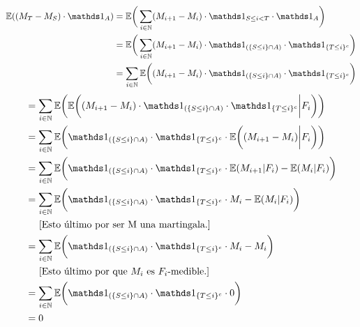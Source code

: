 	 \begin{align}
	 	\E((M_T - M_S) \cdot \indic_A)	
	 									&=		
	 	\E\bigg( \sum_{ i \in \N} ( M_{i+1} - M_i) \cdot \indic_{S \leq i < T } \cdot \indic_A \bigg)									\\
	 									&=		
	 	\E	\bigg( 
	 			\sum_{ i \in \N} 
	 				( M_{i+1} - M_i) \cdot \indic_{(\{S \leq i \} \cap A)} \cdot \indic_{\{ T \leq i \}^c} 
	 		\bigg)																														\\
	 									&=		
	 	\sum_{ i \in \N} 
	 		\E	\bigg(
	 				( M_{i+1} - M_i) \cdot \indic_{(\{S \leq i \} \cap A)} \cdot \indic_{\{ T \leq i \}^c} 
	 			\bigg)																													
	\end{align}
	\begin{align}
	 									&=		
	 	\sum_{ i \in \N} 
	 		\E	\bigg(
		 			\E	\bigg(
		 					( M_{i+1} - M_i) \cdot \indic_{(\{S \leq i \} \cap A)} \cdot \indic_{\{ T \leq i \}^c}  \bigg| F_i	
						\bigg)
	 			\bigg)																													\\
										&=
	 	\sum_{ i \in \N} 
	 		\E	\bigg(
					\indic_{(\{S \leq i \} \cap A)} \cdot \indic_{\{ T \leq i \}^c} \cdot
		 			\E	\bigg(
		 					 ( M_{i+1} - M_i)  \bigg| F_i	 												
						\bigg)
	 			\bigg)																													\\
										&=
	 	\sum_{ i \in \N} 
	 		\E	\bigg(
					\indic_{(\{S \leq i \} \cap A)} \cdot \indic_{\{ T \leq i \}^c} \cdot
		 			\E	(
		 					 M_{i+1} | F_i	 												
						)
					-
					\E	(
		 					 M_i  | F_i	 												
						)
	 			\bigg)																													\\
										&=
	 	\sum_{ i \in \N} 
	 		\E	\bigg(
					\indic_{(\{S \leq i \} \cap A)} \cdot \indic_{\{ T \leq i \}^c} \cdot
		 					 M_i
					-
					\E	(
		 					 M_i  | F_i	 												
						)
	 			\bigg)\label{problema1_4:aplicacion_de_que_M_es_martingala}																\\
										&\;\;\;\;\; \mbox{[Esto último por ser M una martingala.]}									    \\
										&=
	 	\sum_{ i \in \N} 
	 		\E	\bigg(
					\indic_{(\{S \leq i \} \cap A)} \cdot \indic_{\{ T \leq i \}^c} \cdot
		 			 M_i
						-
					 M_i
	 			\bigg)																													\\
										&\;\;\;\;\; \mbox{[Esto último por que $M_i$ es $F_i$-medible.]}								\\
										&=
		\sum_{ i \in \N} 
	 		\E	\bigg(
					\indic_{(\{S \leq i \} \cap A)} \cdot \indic_{\{ T \leq i \}^c} \cdot
		 			 0
	 			\bigg)																													\\
										&=
		0
	 \end{align}
	
